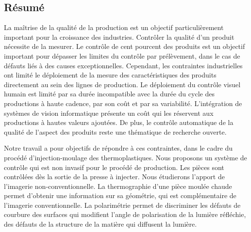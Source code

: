 {}

\vspace*{-1cm}
\begin{flushright}
\section*{\fontsize{20pt}{20pt}\selectfont\textnormal{Résumé}}
\end{flushright}
\vspace{2cm}

\fancyhf{}
\lfoot[\fancyplain{}{}]
{\fancyplain{}{}}
\cfoot[\fancyplain{}{\thepage}]
{\fancyplain{}{\thepage}}
\rfoot[\fancyplain{}{}]
{\fancyplain{}{\scriptsize}}

La maîtrise de la qualité de la production est un objectif particulièrement important pour la croissance des industries.
Contrôler la qualité d'un produit nécessite de la mesurer.
Le contrôle de cent pourcent des produits est un objectif important pour dépasser les limites du contrôle par prélèvement, dans le cas de défauts liés à des causes exceptionnelles.
Cependant, les contraintes industrielles ont limité le déploiement de la mesure des caractéristiques des produits directement au sein des lignes de production.
Le déploiement du contrôle visuel humain est limité par sa durée incompatible avec la durée du cycle des productions à haute cadence, par son coût et par sa variabilité.
L'intégration de systèmes de vision informatique présente un coût qui les réservent aux productions à hautes valeurs ajoutées.
De plus, le contrôle automatique de la qualité de l'aspect des produits reste une thématique de recherche ouverte.

Notre travail a pour objectifs de répondre à ces contraintes, dans le cadre du procédé d'injection-moulage des thermoplastiques.
Nous proposons un système de contrôle qui est non invasif pour le procédé de production.
Les pièces sont contrôlées dès la sortie de la presse à injecter.
Nous étudierons l'apport de l'imagerie non-conventionnelle.
La thermographie d'une pièce moulée chaude permet d'obtenir une information sur sa géométrie, qui est complémentaire de l'imagerie conventionnelle.
La polarimétrie permet de discriminer les défauts de courbure des surfaces qui modifient l'angle de polarisation de la lumière réfléchie, des défauts de la structure de la matière qui diffusent la lumière.


